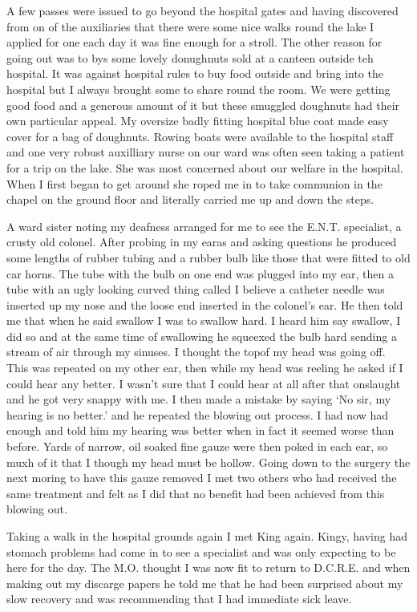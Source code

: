 A few passes were issued to go beyond the hospital gates and having
discovered from on of the auxiliaries that there were some nice walks
round the lake I applied for one each day it was fine enough for a
stroll. The other reason for going out was to bys some lovely
donughnuts sold at a canteen outside teh hospital. It was against
hospital rules to buy food outside and bring into the hospital but I
always brought some to share round the room. We were getting good food
and a generous amount of it but these smuggled doughnuts had their own
particular appeal. My oversize badly fitting hospital blue coat made
easy cover for a bag of doughnuts. Rowing boats were available to the
hospital staff and one very robust auxilliary nurse on our ward was
often seen taking a patient for a trip on the lake. She was most
concerned about our welfare in the hospital. When I first began to get
around she roped me in to take communion in the chapel on the ground
floor and literally carried me up and down the steps.

A ward sister noting my deafness arranged for me to see the
E.N.T. specialist, a crusty old colonel. After probing in my earas and
asking questions he produced some lengths of rubber tubing and a
rubber bulb like those that were fitted to old car horns. The tube
with the bulb on one end was plugged into my ear, then a tube with an
ugly looking curved thing called I believe a catheter needle was
inserted up my nose and the loose end inserted in the colonel's
ear. He then told me that when he said swallow I was to swallow
hard. I heard him say swallow, I did so and at the same time of
swallowing he squeexed the bulb hard sending a stream of air through
my sinuses. I thought the topof my head was going off. This was
repeated on my other ear, then while my head was reeling he asked if I
could hear any better. I wasn't sure that I could hear at all after
that onslaught and he got very snappy with me. I then made a mistake
by saying `No sir, my hearing is no better.' and he repeated the
blowing out process. I had now had enough and told him my hearing was
better when in fact it seemed worse than before. Yards of narrow, oil
soaked fine gauze were then poked in each ear, so muxh of it that I
though my head must be hollow. Going down to the surgery the next
moring to have this gauze removed I met two others who had received
the same treatment and felt as I did that no benefit had been achieved
from this blowing out.

Taking a walk in the hospital grounds again I met \sapper King
again. Kingy, having had stomach problems had come in to see a
specialist and was only expecting to be here for the day. The
M.O. thought I was now fit to return to D.C.R.E. and when making out
my discarge papers he told me that he had been surprised about my slow
recovery and was recommending that I had immediate sick leave.

